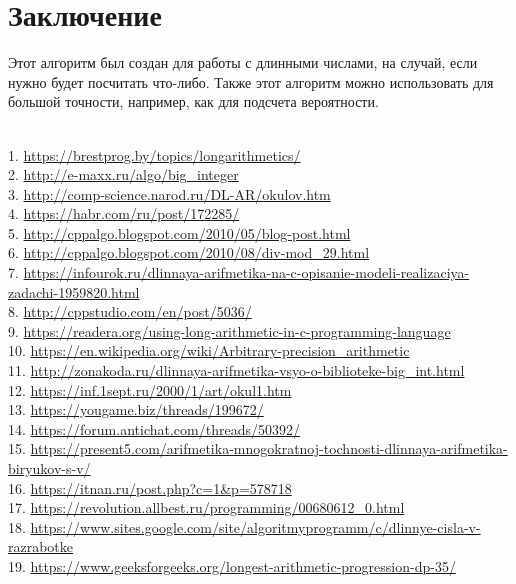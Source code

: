 \documentclass[a4paper]{article}
\begin{document}
\section{Заключение}
Этот алгоритм был создан для работы с длинными числами, на случай, если нужно будет посчитать что-либо. Также этот алгоритм можно использовать для большой точности, например, как для подсчета вероятности.
\newpage



\begin{flushleft}
\\
1. \url{https://brestprog.by/topics/longarithmetics/}\\
2. \url{http://e-maxx.ru/algo/big_integer}\\
3. \url{http://comp-science.narod.ru/DL-AR/okulov.htm}\\
4. \url{https://habr.com/ru/post/172285/}\\
5. \url{http://cppalgo.blogspot.com/2010/05/blog-post.html}\\
6. \url{http://cppalgo.blogspot.com/2010/08/div-mod_29.html}\\
7. \url{https://infourok.ru/dlinnaya-arifmetika-na-c-opisanie-modeli-realizaciya-zadachi-1959820.html}\\
8. \url{http://cppstudio.com/en/post/5036/}\\
9. \url{https://readera.org/using-long-arithmetic-in-c-programming-language}\\
10. \url{https://en.wikipedia.org/wiki/Arbitrary-precision_arithmetic}\\
11. \url{http://zonakoda.ru/dlinnaya-arifmetika-vsyo-o-biblioteke-big_int.html}\\
12. \url{https://inf.1sept.ru/2000/1/art/okul1.htm}\\
13. \url{https://yougame.biz/threads/199672/}\\
14. \url{https://forum.antichat.com/threads/50392/}\\
15. \url{https://present5.com/arifmetika-mnogokratnoj-tochnosti-dlinnaya-arifmetika-biryukov-s-v/}\\
16. \url{https://itnan.ru/post.php?c=1&p=578718}\\
17. \url{https://revolution.allbest.ru/programming/00680612_0.html}\\
18. \url{https://www.sites.google.com/site/algoritmyprogramm/c/dlinnye-cisla-v-razrabotke}\\
19. \url{https://www.geeksforgeeks.org/longest-arithmetic-progression-dp-35/}\\

\end{flushleft}
\end{document}

